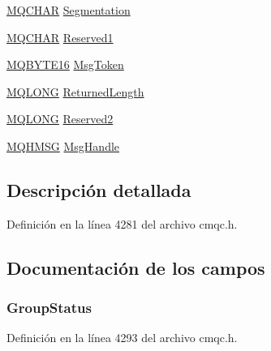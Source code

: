 \begin{DoxyCompactItemize}
\item 
\hyperlink{cmqc_8h_aeb12bc7ba416a4eb603e2a74351418d2}{M\+Q\+C\+H\+A\+R} \hyperlink{structtag_m_q_g_m_o_a2fe04c63168add18793c3328bd6eb373}{Segmentation}
\item 
\hyperlink{cmqc_8h_aeb12bc7ba416a4eb603e2a74351418d2}{M\+Q\+C\+H\+A\+R} \hyperlink{structtag_m_q_g_m_o_a9a6d7674e570f3815495c51129f3828e}{Reserved1}
\item 
\hyperlink{cmqc_8h_afe5ed2c1b7363c2d8f3c068787be6c5d}{M\+Q\+B\+Y\+T\+E16} \hyperlink{structtag_m_q_g_m_o_a7a9f6d7dcb4ca77398c126fa4101733d}{Msg\+Token}
\item 
\hyperlink{cmqc_8h_a1fb8d28cbda3fa8766a9821230cdb6d5}{M\+Q\+L\+O\+N\+G} \hyperlink{structtag_m_q_g_m_o_a24c9ed4498ed0e5859f572f4c29392a4}{Returned\+Length}
\item 
\hyperlink{cmqc_8h_a1fb8d28cbda3fa8766a9821230cdb6d5}{M\+Q\+L\+O\+N\+G} \hyperlink{structtag_m_q_g_m_o_a13f52935f43840169890b9beeaf233d5}{Reserved2}
\item 
\hyperlink{cmqc_8h_a3d110c5d019358ed30e069abddd9525c}{M\+Q\+H\+M\+S\+G} \hyperlink{structtag_m_q_g_m_o_a510e3e3ff77ec3134832fe65c61fc250}{Msg\+Handle}
\end{DoxyCompactItemize}


\subsection{Descripción detallada}


Definición en la línea 4281 del archivo cmqc.\+h.



\subsection{Documentación de los campos}
\hypertarget{structtag_m_q_g_m_o_a20c00b3295996b9ddbf0ed94ad5a2f57}{}
\subsubsection[{Group\+Status}]{ Group\+Status}\label{structtag_m_q_g_m_o_a20c00b3295996b9ddbf0ed94ad5a2f57}


Definición en la línea 4293 del archivo cmqc.\+h.

\hypertarget{structtag_m_q_g_m_o_a64325fedf5fee7e9b76f1ad26dceac2b}{}
